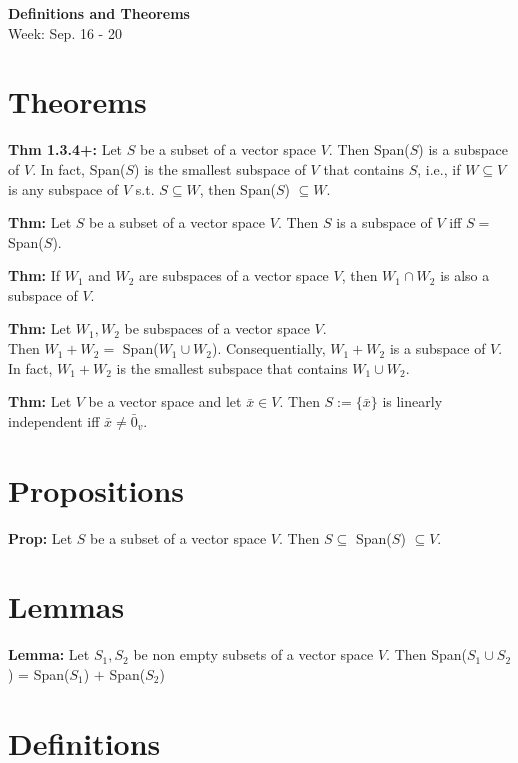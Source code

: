 \noindent
\textbf{\LARGE Definitions and Theorems} \\
\Large Week: Sep. 16 - 20

\section{Theorems}

\textbf{Thm 1.3.4+:} Let $S$ be a subset of a vector space $V$. Then Span($S$) is a subspace of $V$. In fact, Span($S$) is the smallest subspace of $V$ that contains $S$, i.e., if $W \subseteq V$ is any subspace of $V$ s.t. $S \subseteq W$, then Span($S$) $\subseteq W$.

\bigskip

\noindent
\textbf{Thm:} Let $S$ be a subset of a vector space $V$. Then $S$ is a subspace of $V$ iff $S =$ Span($S$).

\bigskip

\noindent
\textbf{Thm:} If $W_1$ and $W_2$ are subspaces of a vector space $V$, then $W_1 \cap W_2$ is also a subspace of $V$.

\bigskip

\noindent
\textbf{Thm:} Let $W_1 , W_2$ be subspaces of a vector space $V$. \\
Then $W_1 + W_2 = $ Span($W_1 \cup W_2$). Consequentially, $W_1 + W_2$ is a subspace of $V$. In fact, $W_1 + W_2$ is the smallest subspace that contains $W_1 \cup W_2$.

\bigskip

\noindent
\textbf{Thm:} Let $V$ be a vector space and let $\bar x \in V$. Then $S := \{\bar x \}$ is linearly independent iff $\bar x \ne \bar 0_v$.

\pagebreak
\section{Propositions}

\textbf{Prop:} Let $S$ be a subset of a vector space $V$. Then $S \subseteq $ Span($S$) $\subseteq V$.

\section{Lemmas} 

\textbf{Lemma:} Let $S_1 , S_2$ be non empty subsets of a vector space $V$. Then Span($S_1 \cup S_2$) = Span($S_1$) $ + $ Span($S_2$)

\pagebreak
\section{Definitions}

